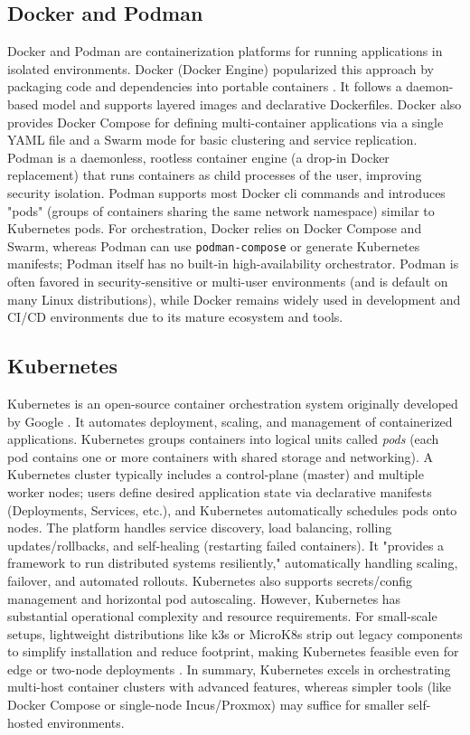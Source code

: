 \subsection*{Docker and Podman}

Docker and Podman are containerization platforms for running applications in isolated environments. Docker (Docker Engine) popularized this approach by packaging code and dependencies into portable containers \cite{spacelift-podman-docker-2024}. It follows a daemon-based model and supports layered images and declarative Dockerfiles. Docker also provides Docker Compose for defining multi-container applications via a single YAML file and a Swarm mode for basic clustering and service replication. Podman is a daemonless, rootless container engine (a drop-in Docker replacement) that runs containers as child processes of the user, improving security isolation. Podman supports most Docker \gls{cli} commands and introduces "pods" (groups of containers sharing the same network namespace) similar to Kubernetes pods. For orchestration, Docker relies on Docker Compose and Swarm, whereas Podman can use \texttt{podman-compose} or generate Kubernetes manifests; Podman itself has no built-in high-availability orchestrator. Podman is often favored in security-sensitive or multi-user environments (and is default on many Linux distributions), while Docker remains widely used in development and CI/CD environments due to its mature ecosystem and tools.

\subsection*{Kubernetes}

Kubernetes is an open-source container orchestration system originally developed by Google \cite{kubernetes-docs-2025}. It automates deployment, scaling, and management of containerized applications. Kubernetes groups containers into logical units called \emph{pods} (each pod contains one or more containers with shared storage and networking). A Kubernetes cluster typically includes a control-plane (master) and multiple worker nodes; users define desired application state via declarative manifests (Deployments, Services, etc.), and Kubernetes automatically schedules pods onto nodes. The platform handles service discovery, load balancing, rolling updates/rollbacks, and self-healing (restarting failed containers). It "provides a framework to run distributed systems resiliently," automatically handling scaling, failover, and automated rollouts. Kubernetes also supports secrets/config management and horizontal pod autoscaling. However, Kubernetes has substantial operational complexity and resource requirements. For small-scale setups, lightweight distributions like k3s or MicroK8s strip out legacy components to simplify installation and reduce footprint, making Kubernetes feasible even for edge or two-node deployments \cite{k3s-microk8s-2022}. In summary, Kubernetes excels in orchestrating multi-host container clusters with advanced features, whereas simpler tools (like Docker Compose or single-node Incus/Proxmox) may suffice for smaller self-hosted environments.

